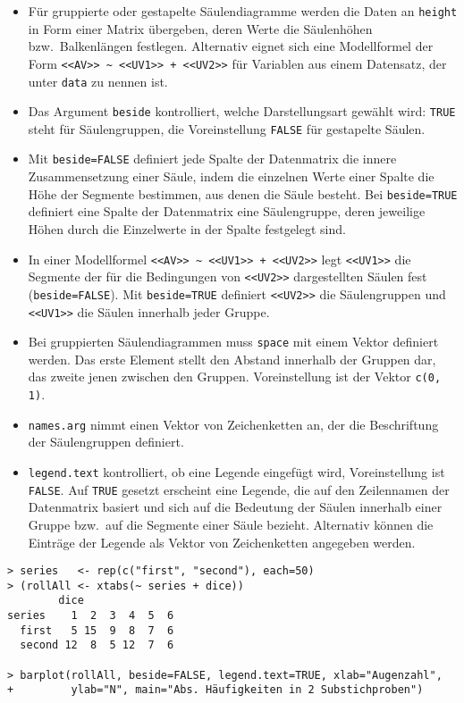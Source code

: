 \begin{itemize}
\item Für gruppierte oder gestapelte Säulendiagramme werden die Daten an \lstinline!height! in Form einer Matrix übergeben, deren Werte die Säulenhöhen bzw.\ Balkenlängen festlegen. Alternativ eignet sich eine Modellformel der Form \lstinline!<<AV>> ~ <<UV1>> + <<UV2>>! für Variablen aus einem Datensatz, der unter \lstinline!data! zu nennen ist.
\item Das Argument \lstinline!beside! kontrolliert, welche Darstellungsart gewählt wird: \lstinline!TRUE! steht für Säulengruppen, die Voreinstellung \lstinline!FALSE! für gestapelte Säulen.
\item Mit \lstinline!beside=FALSE! definiert jede Spalte der Datenmatrix die innere Zusammensetzung einer Säule, indem die einzelnen Werte einer Spalte die Höhe der Segmente bestimmen, aus denen die Säule besteht. Bei \lstinline!beside=TRUE! definiert eine Spalte der Datenmatrix eine Säulengruppe, deren jeweilige Höhen durch die Einzelwerte in der Spalte festgelegt sind.
\item In einer Modellformel \lstinline!<<AV>> ~ <<UV1>> + <<UV2>>! legt \lstinline!<<UV1>>! die Segmente der für die Bedingungen von \lstinline!<<UV2>>! dargestellten Säulen fest (\lstinline!beside=FALSE!). Mit \lstinline!beside=TRUE! definiert \lstinline!<<UV2>>! die Säulengruppen und \lstinline!<<UV1>>! die Säulen innerhalb jeder Gruppe.
\item Bei gruppierten Säulendiagrammen muss \lstinline!space! mit einem Vektor definiert werden. Das erste Element stellt den Abstand innerhalb der Gruppen dar, das zweite jenen zwischen den Gruppen. Voreinstellung ist der Vektor \lstinline!c(0, 1)!.
\item \lstinline!names.arg! nimmt einen Vektor von Zeichenketten an, der die Beschriftung der Säulengruppen definiert.
\item \lstinline!legend.text! kontrolliert, ob eine Legende eingefügt wird, Voreinstellung ist \lstinline!FALSE!\@. Auf \lstinline!TRUE! gesetzt erscheint eine Legende, die auf den Zeilennamen der Datenmatrix basiert und sich auf die Bedeutung der Säulen innerhalb einer Gruppe bzw.\ auf die Segmente einer Säule bezieht. Alternativ können die Einträge der Legende als Vektor von Zeichenketten angegeben werden.
\end{itemize}

\begin{lstlisting}
> series   <- rep(c("first", "second"), each=50)
> (rollAll <- xtabs(~ series + dice))
        dice
series    1  2  3  4  5  6
  first   5 15  9  8  7  6
  second 12  8  5 12  7  6

> barplot(rollAll, beside=FALSE, legend.text=TRUE, xlab="Augenzahl",
+         ylab="N", main="Abs. Häufigkeiten in 2 Substichproben")
\end{lstlisting}

